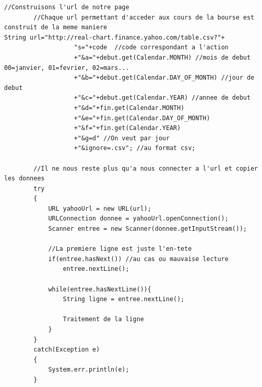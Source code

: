 \begin{lstlisting}
//Construisons l'url de notre page
		//Chaque url permettant d'acceder aux cours de la bourse est construit de la meme maniere
String url="http://real-chart.finance.yahoo.com/table.csv?"+
		           "s="+code  //code correspondant a l'action
		           +"&a="+debut.get(Calendar.MONTH) //mois de debut 00=janvier, 01=fevrier, 02=mars...
		           +"&b="+debut.get(Calendar.DAY_OF_MONTH) //jour de debut
		           +"&c="+debut.get(Calendar.YEAR) //annee de debut
		           +"&d="+fin.get(Calendar.MONTH)
		           +"&e="+fin.get(Calendar.DAY_OF_MONTH)
		           +"&f="+fin.get(Calendar.YEAR)
		           +"&g=d" //On veut par jour
		           +"&ignore=.csv"; //au format csv;
		
		//Il ne nous reste plus qu'a nous connecter a l'url et copier les donnees
		try
		{
			URL yahooUrl = new URL(url);
			URLConnection donnee = yahooUrl.openConnection();
			Scanner entree = new Scanner(donnee.getInputStream());
	
			//La premiere ligne est juste l'en-tete
			if(entree.hasNext()) //au cas ou mauvaise lecture
				entree.nextLine();
			
			while(entree.hasNextLine()){
				String ligne = entree.nextLine();
				
				Traitement de la ligne
			}	
		}
		catch(Exception e)
		{
			System.err.println(e);
		}
\end{lstlisting} 